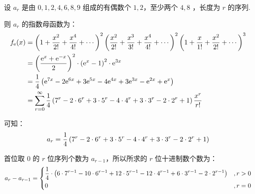 \documentclass[cn, hazy, blue, normal, 12pt]{elegantnote}
\begin{document}
\begin{solution}[print=true]

    设 $a_r$ 是由 $0, 1, 2, 4, 6, 8, 9$ 组成的有偶数个 $1, 2$，至少两个 $4, 8$ ，长度为 $r$ 的序列.

    则 $a_r$ 的指数母函数为：
    \begin{equation}
        \notag
        \begin{aligned}
            f_{\mathrm{e}}(x)
             & = \left(1+\frac{x^2}{2!}+\frac{x^4}{4!}+\cdots\right)^2
            \left(\frac{x^2}{2!}+\frac{x^3}{3!}+\frac{x^4}{4!}+\cdots\right)^2
            \left(1+\frac{x}{1!}+\frac{x^2}{2!}+\cdots\right)^3                \\
             & = \left(\frac{\mathrm{e}^{x}+\mathrm{e}^{-x}}{2}\right)^2 \cdot
            \left(\mathrm{e}^{x}-1\right)^2 \cdot
            \mathrm{e}^{3x}                                                    \\
             & = \frac{1}{4}\left(
            \mathrm{e}^{7x}-2\mathrm{e}^{6x}+3\mathrm{e}^{5x}-4\mathrm{e}^{4x}+
            3\mathrm{e}^{3x}-\mathrm{e}^{2x}+\mathrm{e}^{x}
            \right)                                                            \\
             & =\sum_{r=0}^{\infty}{\frac{1}{4}\left(
            7^r - 2 \cdot 6^r + 3 \cdot 5^r - 4 \cdot 4^r+
            3 \cdot 3^r- 2 \cdot 2^r + 1
            \right)\frac{x^r}{r!}}
        \end{aligned}
    \end{equation}

    可知：
    \begin{equation}
        \notag
        a_r = \frac{1}{4}\left(
        7^r - 2 \cdot 6^r + 3 \cdot 5^r - 4 \cdot 4^r+
        3 \cdot 3^r- 2 \cdot 2^r + 1
        \right)
    \end{equation}

    首位取 $0$ 的 $r$ 位序列个数为 $a_{r-1}$，所以所求的 $r$ 位十进制数个数为：
    \begin{equation}
        \notag
        a_r - a_{r-1} = \left\{
        \begin{aligned}
             & \frac{1}{4} \cdot \left(
            6 \cdot 7^{r-1} - 10 \cdot 6^{r-1} +
            12 \cdot 5^{r-1} - 12 \cdot 4^{r-1} +
            6 \cdot 3^{r-1} - 2 \cdot 2^{r-1}
            \right)
             & , r>0                    \\
             & 0
             & , r=0
        \end{aligned}
        \right.
    \end{equation}

\end{solution}
\end{document}
